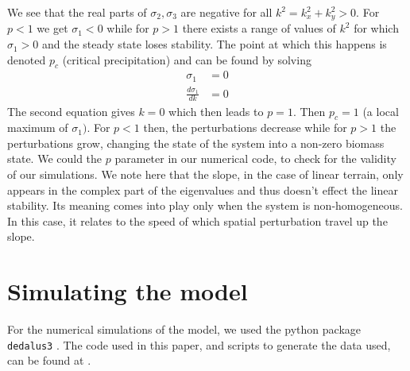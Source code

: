 \documentclass{article}
\numberwithin{equation}{section}
\begin{document}
We see that the real parts of $\sigma_2,\sigma_3$ are negative for all $k^2 = k_x^2+k_y^2>0$. For $p<1$ we get $\sigma_1<0$  while for $p>1$  there exists a range of values of $k^2$  for which $\sigma_1>0$ and the steady state loses stability. The point at which this happens is denoted $p_c$ (critical precipitation) and can be found by solving
\begin{align}
    \sigma_1             & = 0  \\
    \frac{d\sigma_1}{dk} & =  0
\end{align}
The second equation gives $k=0$ which then leads to $p=1$. Then $p_c=1$ (a local maximum of $\sigma_1)$. For $p<1$ then, the perturbations decrease while for $p>1$ the perturbations grow, changing the state of the system into a non-zero biomass state. We could the $p$ parameter in our numerical code, to check for the validity of our simulations.
We note here that the slope, in the case of linear terrain, only appears in the complex part of the eigenvalues and thus doesn't effect the linear stability. Its meaning comes into play only when the system is non-homogeneous. In this case, it relates to the speed of which spatial perturbation travel up the slope.
\section{Simulating the model}

For the numerical simulations of the model, we used the python package \texttt{dedalus3} \parencite[]{dedalus2020}. The code used in this paper, and scripts to generate the data used, can be found at \cite{Ohad_Relation_Between_Biomass_2023}.
\end{document}
